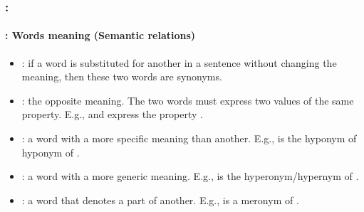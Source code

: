 \documentclass[xcolor=table]{beamer}
\begin{document}
\begin{frame}
	\frametitle{\insertshortsubtitle: \insertsection}
	\framesubtitle{\insertsubsection: Words meaning (Semantic relations)}

	\begin{itemize}
		\item {}: if a word is substituted for another in a sentence without changing the meaning, then these two words are synonyms.
		\item {}: the opposite meaning. The two words must express two values of the same property. E.g.,  and  express the property .
		
		\item {}: a word with a more specific meaning than another.
		E.g.,  is the hyponym of  hyponym of .
		 
		\item {}: a word with a more generic meaning.
		E.g.,  is the hyperonym/hypernym of .
		
		\item {}: a word that denotes a part of another.
		E.g.,  is a meronym of .
	\end{itemize}

\end{frame}
\end{document}

